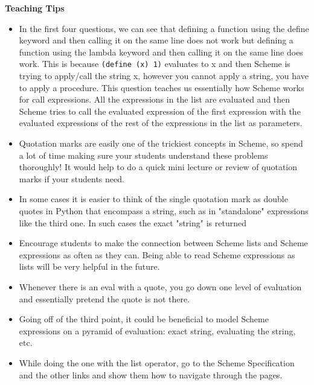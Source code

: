 \begin{blocksection}
\begin{guide}
\textbf{Teaching Tips}
\begin{itemize}
	\item In the first four questions, we can see that defining a function using the define keyword and then calling it on the same line does not work but defining a function using the lambda keyword and then calling it on the same line does work. This is because \lstinline{(define (x) 1)} evaluates to x and then Scheme is trying to apply/call the string x, however you cannot apply a string, you have to apply a procedure. This question teaches us essentially how Scheme works for call expressions. All the expressions in the list are evaluated and then Scheme tries to call the evaluated expression of the first expression with the evaluated expressions of the rest of the expressions in the list as parameters. 
	\item Quotation marks are easily one of the trickiest concepts in Scheme, so spend a lot of time making sure your students understand these problems thoroughly! It would help to do a quick mini lecture or review of quotation marks if your students need.		
	\item In some cases it is easier to think of the single quotation mark as double quotes in Python that encompass a string, such as in "standalone" expressions like the third one. In such cases the exact "string" is returned
	\item Encourage students to make the connection between Scheme lists and Scheme expressions as often as they can. Being able to read Scheme expressions as lists will be very helpful in the future.
	\item Whenever there is an eval with a quote, you go down one level of evaluation and essentially pretend the quote is not there.
	\item Going off of the third point, it could be beneficial to model Scheme expressions on a pyramid of evaluation: exact string, evaluating the string, etc.
	\item While doing the one with the list operator, go to the Scheme Specification and the other links and show them how to navigate through the pages. 
\end{itemize}
\end{guide}
\end{blocksection}